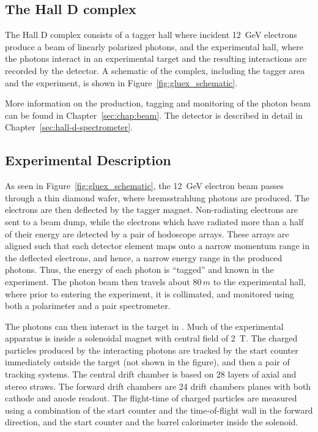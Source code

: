 \subsection[The Hall D complex]{The Hall D complex \label{sec:gluexexperiment:complex}}
The Hall D complex consists of a tagger hall where incident 12~GeV electrons produce
a beam of linearly polarized photons, and the experimental hall, where the photons interact
in an experimental target and the resulting interactions are recorded by the \GX{} detector.
A schematic of the complex, including the tagger area and the \GX{} experiment, is shown 
in Figure~\ref{fig:gluex_schematic}.

More information on the production, tagging and monitoring of the photon beam can be found in
Chapter~\ref{sec:chap:beam}. The \GX{} detector is described in detail in 
Chapter~\ref{sec:hall-d-spectrometer}.
\subsection[Experimental Description]{Experimental Description}
\label{sec:intro:detector}
As seen in Figure~\ref{fig:gluex_schematic}, the 12~GeV electron beam passes through a 
thin diamond wafer, where bremsstrahlung photons are produced. The electrons are then deflected
by the tagger magnet. Non-radiating electrons are sent to a beam dump, while the electrons which
have radiated more than a half of their energy
are detected by a pair of hodoscope arrays. These arrays are aligned such that each detector element
maps onto a narrow momentum range in the deflected electrons, and hence, a narrow energy range
in the produced photons. Thus, the energy of each photon is ``tagged'' and known in  the experiment.
The photon beam then travels about $80\, m$ to the experimental hall, where prior to entering the
experiment, it is collimated, and monitored using both a polarimeter and a pair spectrometer.

The photons can then interact in the target in \GX{}. Much of the experimental apparatus is inside
a solenoidal magnet with central field of 2~T. The charged particles produced by the interacting
photons are tracked by the start counter immediately outside the target (not shown in the figure),
and then a pair of tracking systems. The central drift chamber is based on 28 layers of axial and stereo
straws. The forward drift chambers are 24 drift chambers planes with both cathode
and anode readout.  The flight-time of charged
particles are measured using a combination of the start counter and the time-of-flight wall in the forward
direction, and the start counter and the barrel calorimeter inside the solenoid.

